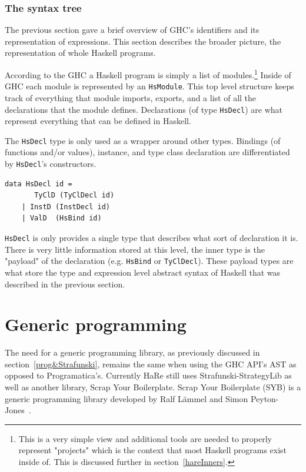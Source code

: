 \subsubsection{The syntax tree}
The previous section gave a brief overview of GHC's identifiers and its representation of expressions. This section describes the broader picture, the representation of whole Haskell programs.  

According to the GHC a Haskell program is simply a list of modules.\footnote{This is a very simple view and additional tools are needed to properly represent "projects" which is the context that most Haskell programs exist inside of. This is discussed further in section~\ref{hareInners}.} Inside of GHC each module is represented by an \texttt{HsModule}. This top level structure keeps track of everything that module imports, exports, and a list of all the declarations that the module defines. Declarations (of type \texttt{HsDecl}) are what represent everything that can be defined in Haskell. 

The \texttt{HsDecl} type is only used as a wrapper around other types. Bindings (of functions and/or values), instance, and type class declaration are differentiated by \texttt{HsDecl}'s constructors. 

\begin{lstlisting}[caption={A subset of \texttt{HsDecl constructors}}]
data HsDecl id =
	   TyClD (TyClDecl id)
	| InstD (InstDecl id)
	| ValD  (HsBind id)
\end{lstlisting}

\texttt{HsDecl} is only provides a single type that describes what sort of declaration it is. There is very little information stored at this level, the inner type is the "payload" of the declaration (e.g. \texttt{HsBind} or \texttt{TyClDecl}). These payload types are what store the type and expression level abstract syntax of Haskell that was described in the previous section.


\section{Generic programming}\label{genProg}
The need for a generic programming library, as previously discussed in section~\ref{prog&Strafunski}, remains the same when using the GHC API's AST as opposed to Programatica's. Currently HaRe still uses Strafunski-StrategyLib as well as another library, Scrap Your Boilerplate. Scrap Your Boilerplate (SYB) is a generic programming library developed by Ralf L{\"a}mmel and Simon Peyton-Jones~\citep{syb}.

